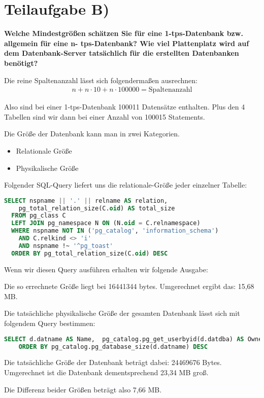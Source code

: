 \section{Teilaufgabe B)}
\textbf{Welche Mindestgrößen schätzen Sie für eine 1-tps-Datenbank bzw. allgemein für eine n-
tps-Datenbank? Wie viel Plattenplatz wird auf dem Datenbank-Server tatsächlich für die
erstellten Datenbanken benötigt?}

Die reine Spaltenanzahl lässt sich folgendermaßen ausrechnen:
\begin{eqnarray}
n + n \cdot 10 + n \cdot 100000 = \mbox{Spaltenanzahl}
\end{eqnarray}

Also sind bei einer 1-tps-Datenbank 100011 Datensätze enthalten. Plus den 4
Tabellen sind wir dann bei einer Anzahl von 100015 Statements.

Die Größe der Datenbank kann man in zwei Kategorien.
\begin{itemize}
  \item Relationale Größe
  \item Physikalische Größe
\end{itemize}

Folgender SQL-Query liefert uns die relationale-Größe jeder einzelner Tabelle:
\begin{lstlisting}[language=sql, caption={Größe der Tabelle und Datensätze
ermitteln}]
  SELECT nspname || '.' || relname AS relation,
    pg_total_relation_size(C.oid) AS total_size
  FROM pg_class C
  LEFT JOIN pg_namespace N ON (N.oid = C.relnamespace)
  WHERE nspname NOT IN ('pg_catalog', 'information_schema')
    AND C.relkind <> 'i'
    AND nspname !~ '^pg_toast'
  ORDER BY pg_total_relation_size(C.oid) DESC
\end{lstlisting}

Wenn wir diesen Query ausführen erhalten wir folgende Ausgabe:

Die so errechnete Größe liegt bei 16441344 bytes. Umgerechnet ergibt das: 
15,68 MB.

Die tatsächliche physikalische Größe der gesamten Datenbank lässt sich mit
folgendem Query bestimmen:
\begin{lstlisting}[language=sql, caption={Physikalische Größe der Datenbank
ermitteln}]
SELECT d.datname AS Name,  pg_catalog.pg_get_userbyid(d.datdba) AS Owner, pg_catalog.pg_database_size(d.datname) AS SIZE FROM pg_catalog.pg_database d
    ORDER BY pg_catalog.pg_database_size(d.datname) DESC
\end{lstlisting}

Die tatsächliche Größe der Datenbank beträgt dabei: 24469676 Bytes. Umgerechnet
ist die Datenbank dementsprechend 23,34 MB groß.

Die Differenz beider Größen beträgt also 7,66 MB.
